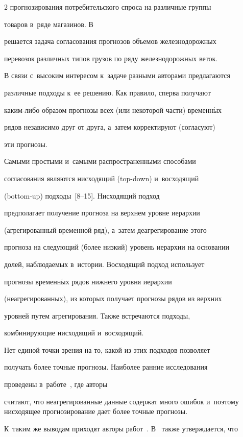 \begin{multicols}{2}
прогнозирования потребительского спроса на различные группы

товаров в~ряде магазинов. В~\cite{stenina2014reconciliation}

решается задача согласования прогнозов объемов железнодорожных

перевозок различных типов грузов по ряду железнодорожных веток.



В связи с~высоким интересом к~задаче разными авторами предлагаются

различные подходы к~ее решению. Как правило, сперва получают

ка\-ким-ли\-бо образом прогнозы всех (или некоторой части) временн$\acute{\mbox{ы}}$х

рядов независимо друг от друга, а~затем корректируют (согласуют)

эти прогнозы.



Самыми простыми и~самыми распространенными способами

согласования являются нисходящий (top-down) и~восходящий

(bottom-up) подходы~[8--15]. Нисходящий подход

предполагает получение прогноза на верхнем уровне иерархии

(агрегированный временной ряд), а~затем деагрегирование этого

прогноза на сле\-ду\-ющий (более низкий) уровень иерархии на основании

долей, наблюдаемых в~истории. Восходящий подход использует

прогнозы временн$\acute{\mbox{ы}}$х рядов нижнего уровня иерархии

(неагрегированных), из которых получает прогнозы рядов из верхних

уровней путем агрегирования. Также встречаются подходы,

комбинирующие нисходящий и~восходящий.



Нет единой точки зрения на то, какой из этих подходов позволяет

получать более точные прогнозы. Наиболее ранние исследования

проведены в~работе~\cite{grunfeld1960aggregation}, где авторы

считают, что неагрегированные данные содержат много ошибок и~поэтому нисходящее прогнозирование дает более точные прогнозы.

К~таким же выводам приходят авторы работ~\cite{fogarty1991production, narasimhan1995production}. В~\cite{fliedner1999investigation} также утверждается, что


\end{multicols}
